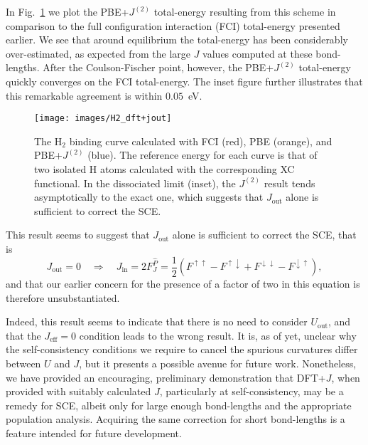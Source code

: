In Fig.~\ref{fig:H2_dft+jout} 
we plot the PBE+$J^{(2)}$ total-energy 
resulting from this scheme 
in comparison to the full configuration interaction (FCI) 
total-energy presented earlier.
%
We see that around equilibrium 
the total-energy has been considerably over-estimated, 
as expected from the large $J$ values 
computed at these bond-lengths.
%
After the Coulson-Fischer point, however, 
the PBE+$J^{(2)}$ total-energy quickly 
converges on the FCI total-energy.
%
The inset figure further illustrates 
that this remarkable agreement is within $0.05$~eV.

\begin{figure}[th!]
\centering
\texttt{[image: images/H2\_dft+jout]}
\caption[Binding energy of H$_2$ with PBE+$J^{(2)}$]
{The H$_2$ binding  curve 
calculated with FCI (red),
PBE (orange), 
and PBE+$J^{(2)}$ (blue).
%
The reference energy for each curve 
is that of two isolated H atoms calculated with 
the corresponding XC functional.
% 
In the dissociated limit (inset),  
the $J^{(2)}$ result tends asymptotically to the exact one, 
which suggests that $J_\textrm{out}$ alone is sufficient to correct the SCE.}
\label{fig:H2_dft+jout}
\end{figure}
%
This result seems to suggest that 
$J_\textrm{out}$ alone is sufficient to correct the SCE, 
that is 
%
\begin{equation}
J_\textrm{out}=0 
\quad\Rightarrow\quad
J_\textrm{in}=2F_J^{\hat{P}}
=\frac{1}{2}\left(F^{\uparrow\uparrow}-F^{\uparrow\downarrow}
+F^{\downarrow\downarrow}-F^{\downarrow\uparrow}\right), 
\end{equation}
%
and that our earlier concern for the presence 
of a factor of two in this equation 
is therefore unsubstantiated.

Indeed, 
this result seems to indicate that there is no need to consider $U_\textrm{out}$, 
and that the $J_\textrm{eff}=0$ condition leads to the wrong result.
%
It is, as of yet, unclear 
why the self-consistency conditions 
we require to cancel the spurious curvatures 
differ between $U$ and $J$, 
but it presents a possible avenue for future work.
%
Nonetheless, 
we have provided an encouraging, preliminary demonstration 
that DFT+$J$, 
when provided with suitably calculated $J$, 
particularly at self-consistency, 
may be a remedy for SCE, 
albeit only for large enough bond-lengths 
and the appropriate population analysis. 
%
Acquiring the same correction for short bond-lengths 
is a feature intended for future development.



